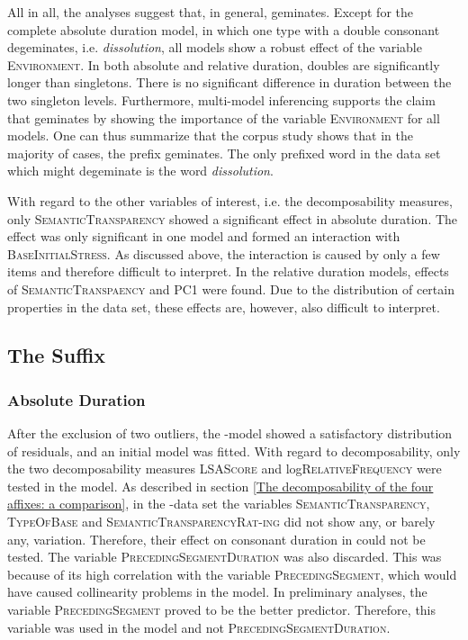 All in all, the analyses suggest that, in general,  geminates. Except for the complete absolute duration model, in which one type with a double consonant degeminates, i.e. \textit{dissolution}, all  models show a robust effect of the variable \textsc{Environment}. In both absolute and relative duration, doubles are significantly longer than singletons. There is no significant difference in duration between the two singleton levels. Furthermore, multi-model inferencing supports the claim that  geminates by showing the importance of the variable \textsc{Environment} for all models. 
One can thus summarize that the corpus study shows that in the majority of cases, the prefix  geminates. The only prefixed word in the data set which might degeminate is the word \textit{dissolution}.

With regard to the other variables of interest, i.e. the decomposability measures, only \textsc{SemanticTransparency} showed a significant effect in absolute duration. The effect was only significant in one model and formed an interaction with \textsc{BaseInitialStress}. As discussed above, the interaction is  caused by only a few items and therefore difficult to interpret.
 In the relative duration models, effects of \textsc{SemanticTranspaency} and \textsc{PC1} were found. Due to the distribution of certain properties in the data set, these effects are, however, also difficult to interpret. 


\subsection{The Suffix }


\subsubsection{Absolute Duration}

After the exclusion of two outliers, the -model showed a satisfactory distribution of residuals, and an initial model was fitted. 
With regard to decomposability, only the two decomposability measures \textsc{LSAScore} and log\textsc{RelativeFrequency} were tested in the model. As described in section \ref{The decomposability of the four affixes: a comparison}, in the -data set the variables \textsc{SemanticTransparency}, \textsc{TypeOfBase}  and \textsc{SemanticTransparencyRat-ing} did not show any, or barely any, variation. Therefore, their effect on consonant duration in  could not be tested. The variable \textsc{PrecedingSegmentDuration} was also discarded. This was because of its high correlation with the variable \textsc{PrecedingSegment}, which would have caused collinearity problems in the model. In preliminary analyses, the variable \textsc{PrecedingSegment} proved to be the better predictor. Therefore, this variable was used in the model and not \textsc{PrecedingSegmentDuration}. 

